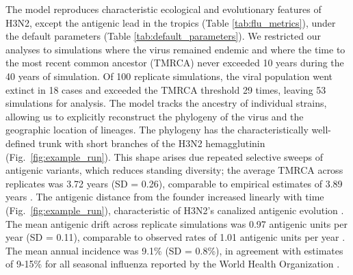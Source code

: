 \documentclass[10pt]{article}
\begin{document}
The model reproduces characteristic ecological and evolutionary features of H3N2, except the antigenic lead in the tropics (Table \ref{tab:flu_metrics}), under the default parameters (Table \ref{tab:default_parameters}). 
We restricted our analyses to simulations where the virus remained endemic and where the time to the most recent common ancestor (TMRCA) never exceeded 10 years during the 40 years of simulation. 
Of 100 replicate simulations, the viral population went extinct in 18 cases and exceeded the TMRCA threshold 29 times, leaving 53 simulations for analysis.
The model tracks the ancestry of individual strains, allowing us to explicitly reconstruct the phylogeny of the virus and the geographic location of lineages.
The phylogeny has the characteristically well-defined trunk with short branches of the H3N2 hemagglutinin (Fig.~\ref{fig:example_run}). 
This shape arises due repeated selective sweeps of antigenic variants, which reduces standing diversity; the average TMRCA across replicates was 3.72 years (SD = 0.26), comparable to empirical estimates of 3.89 years \cite{Bedford:2015fj}.
The antigenic distance from the founder increased linearly with time (Fig.~\ref{fig:example_run}), characteristic of H3N2's canalized antigenic evolution \cite{Bedford:2012bx,Smith:2004jc}. 
The mean antigenic drift across replicate simulations was 0.97 antigenic units per year (SD = 0.11), comparable to observed rates of 1.01 antigenic units per year \cite{Bedford:2014bf}. 
The mean annual incidence was 9.1\% (SD = 0.8\%), in agreement with estimates of 9-15\% for all seasonal influenza reported by the World Health Organization \cite{WHO:2014}.
\end{document}
